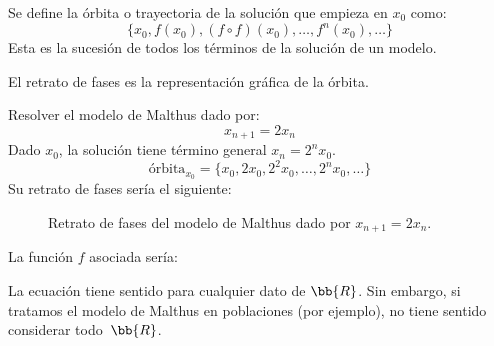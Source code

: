 \begin{definicion}
    Se define la órbita o trayectoria de la solución que empieza en $x_0$ como:
    $$ \{ x_0, f(x_0), (f\circ f)(x_0), \ldots, f^{n}(x_0), \ldots \}$$
    Esta es la sucesión de todos los términos de la solución de un modelo.
\end{definicion}
\begin{definicion}
    El retrato de fases es la representación gráfica de la órbita.
\end{definicion}
\begin{ejemplo} Resolver el modelo de Malthus dado por:
    $$x_{n+1} = 2x_n$$
    Dado $x_0$, la solución tiene término general $x_n = 2^n x_0$.\newline
    $$\text{órbita}_{x_0} = \{ x_0, 2x_0, 2^2 x_0, \ldots, 2^n x_0, \ldots \} $$
    Su retrato de fases sería el siguiente: 
    \begin{figure}[H]
        \centering
        \caption{Retrato de fases del modelo de Malthus dado por $x_{n+1}=2x_n$.}
    \end{figure}
    La función $f$ asociada sería:
    
    La ecuación tiene sentido para cualquier dato de $\bb{R}$. Sin embargo, si tratamos el modelo de Malthus en poblaciones (por ejemplo), no tiene sentido considerar todo~$\bb{R}$.
\end{ejemplo}

